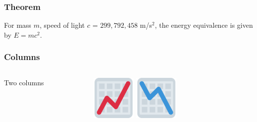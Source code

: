 



\begin{frame}
\frametitle{Theorem}
\begin{theorem}
  For mass $m$, speed of light $c$ = $299,792,458$ m/s$^2$, the energy
  equivalence is given by $E = mc^2.$
\end{theorem}
\end{frame}


\begin{frame}
  \frametitle{Columns}
  
  \begin{columns}
    \begin{column}{0.5\textwidth}
      Two columns
    \end{column}
    \begin{column}{0.5\textwidth}  %
      \begin{center}
        \includegraphics[width=0.25\textwidth]{figures/emoji-graph-upwards.png} \;\;
        \includegraphics[width=0.25\textwidth]{figures/emoji-graph-downwards.png} 
      \end{center}
    \end{column}
  \end{columns}
  
\end{frame}


